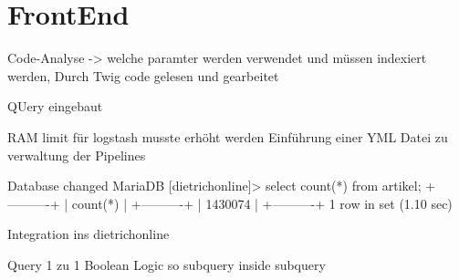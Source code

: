\chapter{FrontEnd}

Code-Analyse -> welche paramter werden verwendet und müssen indexiert werden,
Durch Twig code gelesen und gearbeitet

QUery eingebaut

RAM limit für logstash musste erhöht werden
Einführung einer YML Datei zu verwaltung der Pipelines

Database changed
MariaDB [dietrichonline]> select count(*) from artikel;
+----------+
| count(*) |
+----------+
|  1430074 |
+----------+
1 row in set (1.10 sec)

Integration ins dietrichonline

Query 1 zu 1 
Boolean Logic so subquery inside subquery
